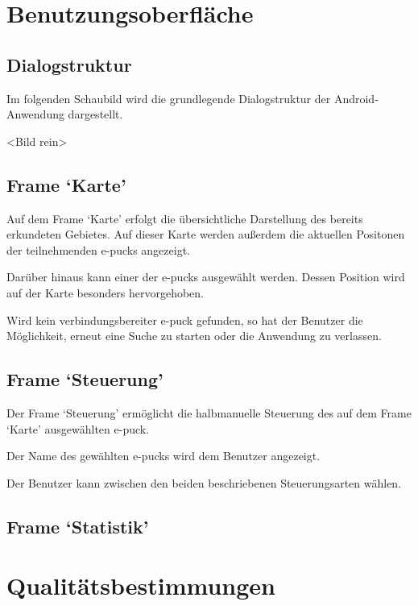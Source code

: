 \documentclass[10pt,a4paper]{article}
\begin{document}
	\section{Benutzungsoberfläche}
	
			\subsection{Dialogstruktur}
			Im folgenden Schaubild wird die grundlegende Dialogstruktur der Android-Anwendung dargestellt.
			
			<Bild rein>
			
			\subsection{Frame `Karte'}
			Auf dem Frame `Karte' erfolgt die übersichtliche Darstellung des bereits erkundeten Gebietes. Auf dieser Karte werden außerdem
			die aktuellen Positonen der teilnehmenden e-pucks angezeigt.
			
			Darüber hinaus kann einer der e-pucks ausgewählt werden. Dessen Position wird auf der Karte besonders hervorgehoben.
			
			Wird kein verbindungsbereiter e-puck gefunden, so hat der Benutzer die Möglichkeit, erneut eine Suche zu starten oder die Anwendung
			zu verlassen.
			\subsection{Frame `Steuerung'}
			Der Frame `Steuerung' ermöglicht die halbmanuelle Steuerung des auf dem Frame `Karte' ausgewählten e-puck.
			
			Der Name des gewählten e-pucks wird dem Benutzer angezeigt.
			
			Der Benutzer kann zwischen den beiden beschriebenen Steuerungsarten wählen.
			\subsection{Frame `Statistik'}

	\section{Qualitätsbestimmungen}
		
\end{document}
